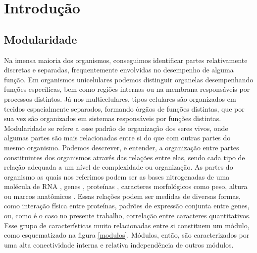 \cleardoublepage
\pagestyle{fancy}

\chapter{Introdução}\label{intro}

\section{Modularidade}\label{intro:modularidade}

Na imensa maioria dos organismos, conseguimos identificar partes relativamente discretas
e separadas, frequentemente envolvidas no desempenho de alguma função.
Em organismos unicelulares podemos distinguir organelas desempenhando
funções específicas, bem como regiões internas ou na membrana responsáveis por
processos distintos.
Já nos multicelulares, tipos celulares são organizados em tecidos espacialmente
separados, formando órgãos de funções distintas, que por sua vez são
organizados em sistemas responsáveis por funções distintas.
Modularidade se refere a esse padrão de organização dos seres vivos, onde
algumas partes são mais relacionadas entre si do que com outras partes
do mesmo organismo.
Podemos descrever, e entender, a organização entre partes
constituintes dos organismos através das relações entre elas, sendo cada
tipo de relação adequada a um nível de complexidade ou organização.
As partes do organismo as quais nos referimos podem ser as bases
nitrogenadas de uma molécula de RNA \citep{Ancel2000}, genes
\citep{Costanzo2010}, proteínas \citep{Han2004}, caracteres morfológicos
como peso, altura ou marcos anatômicos \citep{Klingenberg2008,
Porto2009, Marroig2009}.
Essas relações podem ser medidas de diversas formas, como interação física
entre proteínas, padrões de expressão conjunta entre genes, ou, como é o caso
no presente trabalho, correlação entre caracteres quantitativos.
Esse grupo de características muito relacionadas entre si constituem um
módulo, como esquematizado na figura \ref{modulos}.
Módulos, então, são caracterizados por uma alta conectividade interna e
relativa independência de outros módulos.


